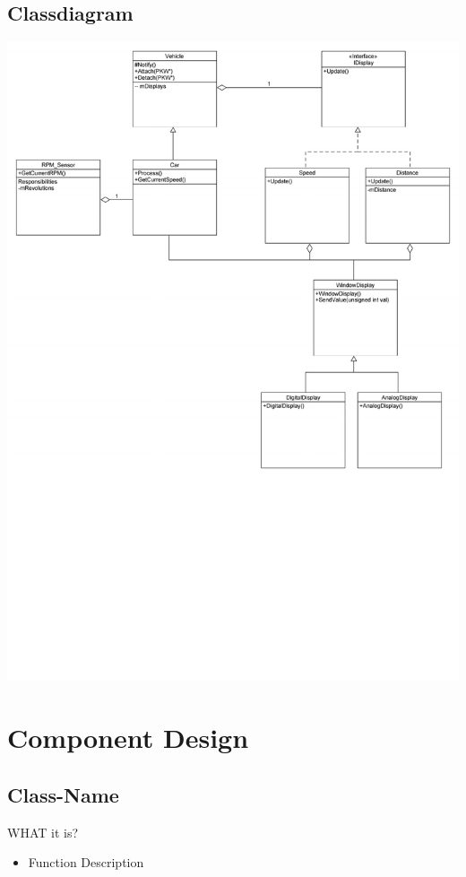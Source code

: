 \subsection{Classdiagram}
\includegraphics[scale=0.65]{ClassDiagramm}


\newpage
\section{Component Design}
\subsection{Class-Name}
WHAT it is?
\begin{itemize}
	\item Function
	\subitem Description
\end{itemize}

